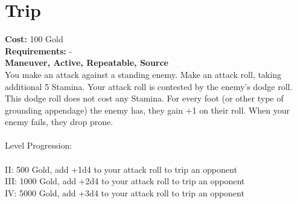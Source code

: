 \section*{Trip}
\textbf{Cost:} 100 Gold\\
\textbf{Requirements:} -\\
\textbf{Maneuver, Active, Repeatable, Source}\\
You make an attack against a standing enemy. Make an attack roll, taking additional 5 Stamina. Your attack roll is contested by the enemy's dodge roll. This dodge roll does not cost any Stamina. For every foot (or other type of grounding appendage) the enemy has, they gain +1 on their roll. When your enemy fails, they drop prone. \\
\\
Level Progression:\\
\\
II: 500 Gold, add +1d4 to your attack roll to trip an opponent\\
III: 1000 Gold, add +2d4 to your attack roll to trip an opponent\\
IV: 5000 Gold, add +3d4 to your attack roll to trip an opponent\\